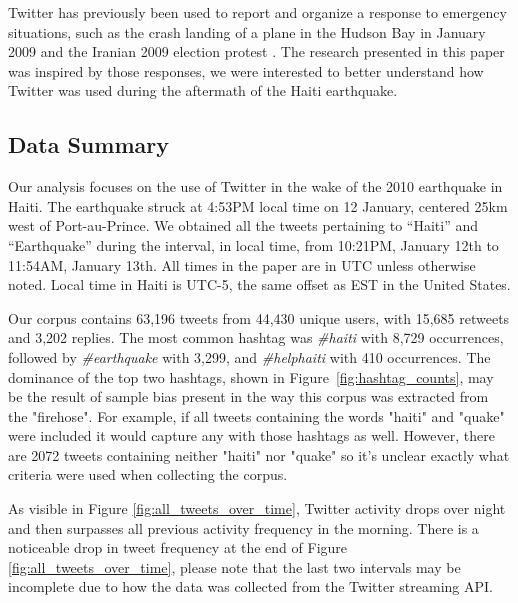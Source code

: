 \documentclass[a4paper, 11pt, titlepage]{article}
\begin{document}
Twitter has previously been used to report and organize a response to emergency situations, such as the crash landing of a plane in the Hudson Bay in January 2009 \cite{Deards2009} and the Iranian 2009 election protest \cite{Grossman2009}.  The research presented in this paper was inspired by those responses, we were interested to better understand how Twitter was used during the aftermath of the Haiti earthquake.

\subsection{Data Summary}
Our analysis focuses on the use of Twitter in the wake of the 2010 earthquake in Haiti. The earthquake struck at 4:53PM local time on 12 January, centered 25km west of Port-au-Prince. We obtained all the tweets pertaining to ``Haiti'' and ``Earthquake'' during the interval, in local time, from 10:21PM, January 12th to 11:54AM, January 13th.  All times in the paper are in UTC unless otherwise noted.  Local time in Haiti is UTC-5, the same offset as EST in the United States.

Our corpus contains 63,196 tweets from 44,430 unique users, with 15,685 retweets and 3,202 replies. The most common hashtag was \textit{\#haiti} with 8,729 occurrences, followed by \textit{\#earthquake} with 3,299, and \textit{\#helphaiti} with 410 occurrences. The dominance of the top two hashtags, shown in Figure~\ref{fig:hashtag_counts}, may be the result of sample bias present in the way this corpus was extracted from the "firehose". For example, if all tweets containing the words "haiti" and "quake" were included it would capture any with those hashtags as well. However, there are 2072 tweets containing neither "haiti" nor "quake" so it's unclear exactly what criteria were used when collecting the corpus.

As visible in Figure \ref{fig:all_tweets_over_time}, Twitter activity drops over night and then surpasses all previous activity frequency in the morning.  There is a noticeable drop in tweet frequency at the end of Figure \ref{fig:all_tweets_over_time}, please note that the last two intervals may be incomplete due to how the data was collected from the Twitter streaming API.
\end{document}
